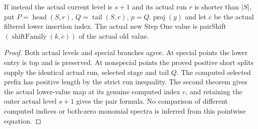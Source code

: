 \begin{theorem}
\label{hir:original-interior-full-family-short-positive-step-one-value}
\leanok
{}
If instead the actual current level is $s+1$ and its actual run $r$ is
shorter than $|S|$, put $P=\operatorname{head}(S,r)$,
$Q=\operatorname{tail}(S,r)$, $p=Q.\operatorname{proj}(y)$ and let $c$
be the actual filtered lower insertion index.  The actual new Step One
value is pairShift$(\operatorname{shiftFamily}(k,c))$ of the actual old value.
\end{theorem}
\begin{proof}
Both actual levels and special branches agree.  At special points the
lower entry is top and is preserved.  At nonspecial points the proved
positive short splits supply the identical actual run, selected stage and
tail $Q$.  The computed selected prefix has positive length by the strict
run inequality.  The second theorem gives the actual lower-value map at
its genuine computed index $c$, and retaining the outer actual level
$s+1$ gives the pair formula.  No comparison of different computed indices
or both-zero monomial spectra is inferred from this pointwise equation.
\end{proof}

